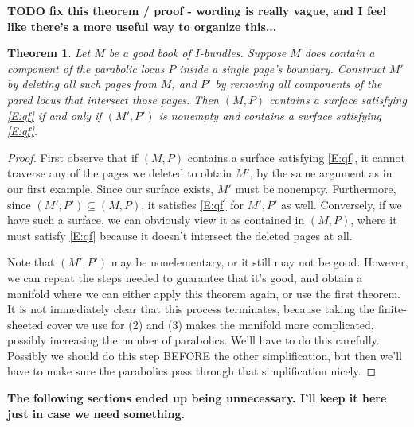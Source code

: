 \documentclass[12pt]{amsart}
\newtheorem{thm}[theorem]{Theorem}
\theoremstyle{definition}
\theoremstyle{remark}
\newcommand{\cin}{\subseteq}
\begin{document}
\textbf{ TODO fix this theorem / proof - wording is really vague, and I feel like
there's a more useful way to organize this...}

\begin{thm}

Let $M$ be a good book of $I$-bundles.  Suppose $M$ does contain a component of
the parabolic locus $P$ inside a single page's boundary.  Construct $M'$ by
deleting all such pages from $M$, and $P'$ by removing all components of the
pared locus that intersect those pages. Then $(M,P)$ contains a surface
satisfying \eqref{E:qf} if and only if $(M',P')$ is nonempty and contains
a surface satisfying \eqref{E:qf}.

\end{thm}

\begin{proof}

First observe that if $(M,P)$ contains a surface satisfying \eqref{E:qf}, it cannot
traverse any of the pages we deleted to obtain $M'$, by the same argument as in
our first example.  Since our surface exists, $M'$ must be nonempty.
Furthermore, since $(M',P') \cin (M,P)$, it satisfies \eqref{E:qf} for $M',P'$ as well.
Conversely, if we have such a surface, we can obviously view it as contained in
$(M,P)$, where it must satisfy \eqref{E:qf} because it doesn't intersect the deleted
pages at all.

Note that $(M',P')$ may be nonelementary, or it still may not be good.
However, we can repeat the steps needed to guarantee that it's good, and obtain
a manifold where we can either apply this theorem again, or use the first
theorem. It is not immediately clear that this process terminates, because
taking the finite-sheeted cover we use for (2) and (3) makes the manifold more
complicated, possibly increasing the number of parabolics. We'll have to do
this carefully. Possibly we should do this step BEFORE the other
simplification, but then we'll have to make sure the parabolics pass through
that simplification nicely.

\end{proof}

\textbf{ The following sections ended up being unnecessary. I'll keep it here just
in case we need something. }
\end{document}
